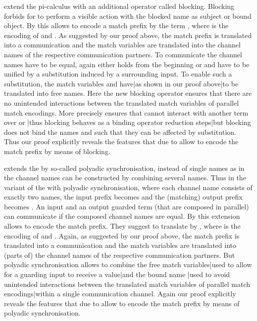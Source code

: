 \documentclass[]{article}
\begin{document}
\cite{vivas} extend the pi-calculus with an additional operator  called blocking. Blocking forbids for  to perform a visible action with the blocked name  as subject or bound object. By \cite{vivas} this allows to encode a match prefix  by the term , where  is the encoding of  and . As suggested by our proof above, the match prefix is translated into a communication and the match variables are translated into the channel names of the respective communication partners. To communicate the channel names have to be equal, \ie again either  holds from the beginning or  and  have to be unified by a substitution induced by a surrounding input. To enable such a substitution, the match variables  and  {have}|{as} shown in our proof {above}|{to} be translated into free names. Here the new blocking operator ensures that there are no unintended interactions between the translated match variables of parallel match encodings. More precisely  ensures that  cannot interact with another term over  or |{thus} blocking behaves as a binding operator \wrt reduction {steps}|{but} blocking does not bind the names  and  such that they can be affected by substitution.
Thus our proof explicitly reveals the features that due to \cite{vivas} allow to encode the match prefix by means of blocking.

\cite{carbone} extends the \piCal by so-called polyadic synchronisation, \ie instead of single names as in the \piCal channel names can be constructed by combining several names. Thus \eg in the variant of the \piCal with polyadic synchronisation, where each channel name consists of exactly two names, the input prefix becomes  and the (matching) output prefix becomes . An input and an output guarded term (that are composed in parallel) can communicate if the composed channel names are equal. By \cite{carbone} this extension allows to encode the match prefix. They suggest to translate  by , where  is the encoding of  and . Again, as suggested by our proof above, the match prefix is translated into a communication and the match variables are translated into (parts of) the channel names of the respective communication partners. But polyadic synchronisation allows to combine the free match {variables}|{used} to allow for a guarding input to receive a {value}|{and} the bound name |{used} to avoid unintended interactions between the translated match variables of parallel match {encodings}|{within} a single communication channel.
Again our proof explicitly reveals the features that due to \cite{carbone} allow to encode the match prefix by means of polyadic synchronisation.
\end{document}
